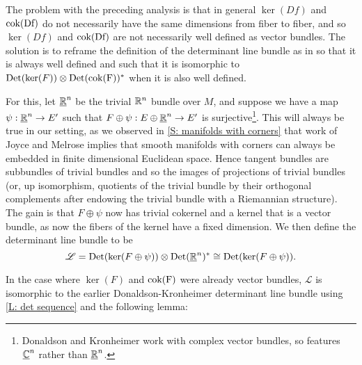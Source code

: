The problem with the preceding analysis is that in general $\ker(Df)$ and $\rm cok(Df)$ do not necessarily have the same dimensions from fiber to fiber, and so $\ker(Df)$ and $\rm cok(Df)$ are not necessarily well defined as vector bundles. The solution is to reframe the definition of the determinant line bundle as in \cite{DoKr90} so that it is always well defined and such that it is isomorphic to ${\rm Det}(\ker(F))\otimes {\rm Det}(\rm cok(F))^*$ when it is also well defined.

For this, let $\underline{\mathbb{R}}^n$ be the trivial $\mathbb{R}^n$ bundle over $M$, and suppose we have a map $\psi:\underline{\mathbb{R}}^n\to E'$ such that $F\oplus \psi:E\oplus \underline{\mathbb{R}}^n\to E'$ is surjective\footnote{Donaldson and Kronheimer work with complex vector bundles, so \cite{DoKr90} features $\underline{\mathbb{C}}^n$ rather than $\underline{\mathbb{R}}^n$.}. This will always be true in our setting, as we observed in \cref{S: manifolds with corners} that work of Joyce and Melrose implies that smooth manifolds with corners can always be embedded in finite dimensional Euclidean space. Hence tangent bundles are subbundles of trivial bundles and so the images of projections of trivial bundles (or, up isomorphism, quotients of the trivial bundle by their orthogonal complements after endowing the trivial bundle with a Riemannian structure). The gain is that $F\oplus \psi$ now has trivial cokernel and a kernel that is a vector bundle, as now the fibers of the kernel have a fixed dimension. We then define the determinant line bundle to be  $$\mathscr L={\rm Det}(\ker(F\oplus \psi))\otimes {\rm Det}(\underline{\mathbb{R}}^n)^*\cong {\rm Det}(\ker(F\oplus \psi)).$$

In the case where $\ker(F)$ and $\rm cok(F)$ were already vector bundles, $\mathscr L$ is isomorphic to the earlier Donaldson-Kronheimer determinant line bundle  using \cref{L: det sequence} and the following lemma:

